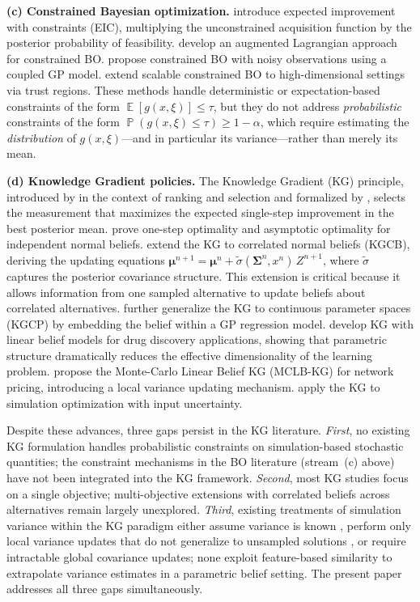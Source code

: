 \documentclass[12pt]{article}
\theoremstyle{plain}
\theoremstyle{definition}
\theoremstyle{remark}
\DeclareMathOperator{\E}{\mathbb{E}}
\DeclareMathOperator{\Prob}{\mathbb{P}}
\newcommand{\bmu}{\bm{\mu}}
\newcommand{\bSigma}{\bm{\Sigma}}
\begin{document}
\medskip
\noindent\textbf{(c) Constrained Bayesian optimization.}
\citet{Gelbart2014} introduce expected improvement with constraints
(EIC), multiplying the unconstrained acquisition function by the
posterior probability of feasibility.  \citet{Gramacy2016} develop an
augmented Lagrangian approach for constrained BO.
\citet{Letham2019} propose constrained BO with noisy observations
using a coupled GP model.  \citet{Eriksson2021} extend scalable
constrained BO to high-dimensional settings via trust regions.
These methods handle deterministic or expectation-based constraints of
the form $\E[g(x,\xi)]\le\tau$, but they do not address
\emph{probabilistic} constraints of the form
$\Prob(g(x,\xi)\le\tau)\ge 1-\alpha$, which require estimating the
\emph{distribution} of $g(x,\xi)$---and in particular its
variance---rather than merely its mean.

\medskip
\noindent\textbf{(d) Knowledge Gradient policies.}
The Knowledge Gradient (KG) principle, introduced by
\citet{Gupta1996} in the context of ranking and selection and
formalized by \citet{Frazier2008}, selects the measurement that
maximizes the expected single-step improvement in the best posterior
mean.  \citet{Frazier2008} prove one-step optimality and asymptotic
optimality for independent normal beliefs.
\citet{Frazier2009} extend the KG to correlated normal beliefs
(KGCB), deriving the updating equations
$\bmu^{n+1}=\bmu^n+\tilde{\sigma}(\bSigma^n,x^n)\,Z^{n+1}$, where
$\tilde{\sigma}$ captures the posterior covariance structure.  This
extension is critical because it allows information from one sampled
alternative to update beliefs about correlated alternatives.
\citet{Scott2011} further generalize the KG to continuous parameter
spaces (KGCP) by embedding the belief within a GP regression model.
\citet{Negoescu2011} develop KG with linear belief models for drug
discovery applications, showing that parametric structure dramatically
reduces the effective dimensionality of the learning problem.
\citet{Tan2016} propose the Monte-Carlo Linear Belief KG (MCLB-KG)
for network pricing, introducing a local variance updating mechanism.
\citet{Qu2015} apply the KG to simulation optimization with input
uncertainty.

Despite these advances, three gaps persist in the KG literature.
\emph{First}, no existing KG formulation handles probabilistic
constraints on simulation-based stochastic quantities; the constraint
mechanisms in the BO literature (stream~(c) above) have not been
integrated into the KG framework.  \emph{Second}, most KG studies
focus on a single objective; multi-objective extensions with
correlated beliefs across alternatives remain largely unexplored.
\emph{Third}, existing treatments of simulation variance within the KG
paradigm either assume variance is known \citep{Frazier2008,
Frazier2009}, perform only local variance updates that do not
generalize to unsampled solutions \citep{Tan2016}, or require
intractable global covariance updates; none exploit feature-based
similarity to extrapolate variance estimates in a parametric belief
setting.  The present paper addresses all three gaps simultaneously.
\end{document}
